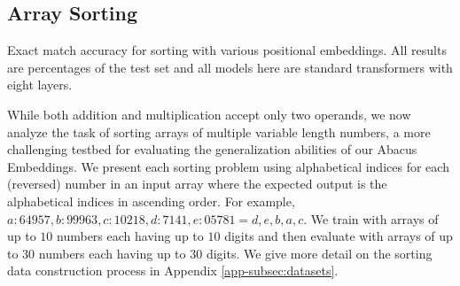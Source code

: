\documentclass{article}
\begin{document}
\subsection{Array Sorting}
\begin{table}
\centering
\vspace{-2em}
\caption{Exact match accuracy for sorting with various positional embeddings. All results are percentages of the test set and all models here are standard transformers with eight layers.
}
\label{table:sort_embed}
\vspace{2em}
\caption{Accuracy for sorting with various architectures for sorting. ST denotes standard transformer, ST w/ II denotes standard transformer with input injection, and LT denotes looped transformer models. 
The standard transformer has the best exact match accuracy.
When measuring the accuracy on identifying only the minimum element of the array, looped transformers outperform all others.
All results are percentages of the test set.}

\label{table:sort_model}
\vspace{-2em}
\end{table}

While both addition and multiplication accept only two operands, we now analyze the task of sorting arrays of multiple variable length numbers, a more challenging testbed for evaluating the generalization abilities of our Abacus Embeddings.
We present each sorting problem using alphabetical indices for each (reversed) number in an input array where the expected output is the alphabetical indices in ascending order. For example, 
\(a:64957,b:99963,c:10218,d:7141,e:05781=d,e,b,a,c\).
We train with arrays of up to \(10\) numbers each having up to \(10\) digits and then evaluate with arrays of up to \(30\) numbers each having up to \(30\) digits.
We give more detail on the sorting data construction process in Appendix \ref{app-subsec:datasets}.
\end{document}
